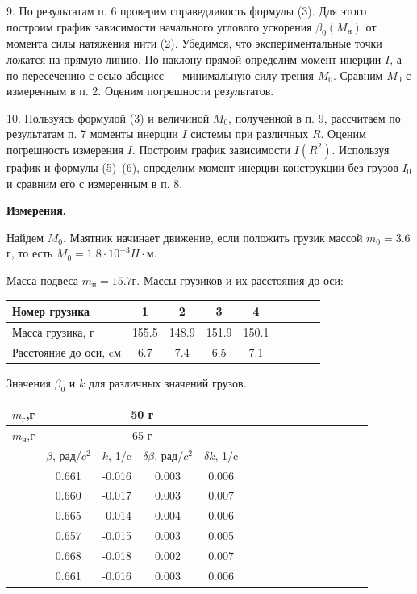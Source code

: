 \documentclass[14pt]{article}
\begin{document}
9. По результатам п. 6 проверим справедливость формулы (3). Для этого построим график зависимости начального углового ускорения $\beta_0(M_\text{н})$ от момента силы натяжения нити (2). Убедимся, что экспериментальные точки ложатся на прямую линию. По наклону прямой определим момент инерции $I$, а по пересечению с осью абсцисс --- минимальную силу трения $M_0$. Сравним $M_0$ с измеренным в п. 2. Оценим погрешности результатов.

10. Пользуясь формулой (3) и величиной $M_0$, полученной в п. 9, рассчитаем по результатам п. 7 моменты инерции $I$ системы при различных $R$. Оценим погрешность измерения $I$. Построим график зависимости $I(R^2)$. Используя график и формулы (5)–(6), определим момент инерции конструкции без грузов $I_0$ и сравним его с измеренным в п. 8.

\vspace{1cm}
\textbf{Измерения.}

\vspace{1cm}
\noindent Найдем $M_0$. Маятник начинает движение, если положить грузик массой $m_0 = 3.6$г, то есть $M_0 = 1.8 \cdot 10^{-3} H\cdot\text{м}$.

\vspace{1cm}

\noindent Масса подвеса $m_\text{п} = 15.7$г. 
\noindent Массы грузиков и их расстояния до оси:
\begin{center}
\begin{tabular}{|l|c|c|c|c|c|c|c|c|}
\hline
Номер грузика			&	1		&	2		&	3		&	4		\\
\hline
Масса грузика, г		&	155.5	&	148.9	&	151.9	&	150.1	\\
\hline
Расстояние до оси, cм	&	6.7		&	7.4		&	6.5		&	7.1		\\
\hline
\end{tabular}
\end{center}

\vspace{1cm}
\noindent Значения $\beta_0$ и $k$ для различных значений грузов.

\begin{center}
\begin{tabular}{|c|c|c|c|c|c|c|c|c|c|c|c|c|c|c|c|}
\hline
$m_\text{г}$,г	&\multicolumn{4}{|c|}{50 г}			\\
\hline
$m_\text{н}$,г	&\multicolumn{4}{|c|}{65 г}		\\
\hline
				&	$\beta$, рад/$c^2$		&	$k$, 1/c		&	$\delta\beta$, рад/$c^2$		&	$\delta k$, 1/c			\\
\hline
				&	0.661					&	-0.016			&	0.003							&	0.006					\\
\hline
				&	0.660					&	-0.017			&	0.003							&	0.007					\\
\hline
				&	0.665					&	-0.014			&	0.004							&	0.006					\\
\hline
				&	0.657					&	-0.015			&	0.003							&	0.005					\\
\hline
				&	0.668					&	-0.018			&	0.002							&	0.007					\\
\hline
				&	0.661					&	-0.016			&	0.003							&	0.006					\\
\hline
\end{tabular}
\end{center}
\end{document}
